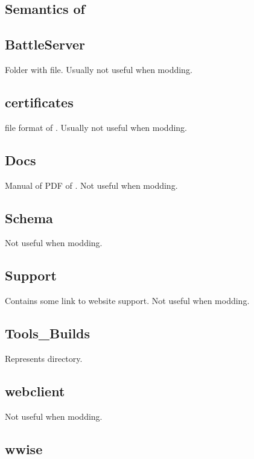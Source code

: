 \begin{appendices}
    \chapter{Semantics of \aoeexedir{}}
    \label{chp:semantics}
    
    \section{BattleServer}

    Folder with  file. Usually not useful when modding.

    \section{certificates}

     file format of \aoe{}. Usually not useful when modding.

    \section{Docs}

    Manual of PDF of \aoe{}. Not useful when modding.

    \section{Schema}

    Not useful when modding.

    \section{Support}

    Contains some link to \aoe{} website support. Not useful when modding.

    \section{Tools\_Builds}

    Represents \genie{} directory.

    \section{webclient}

    Not useful when modding.

    \section{wwise}


\end{appendices}
